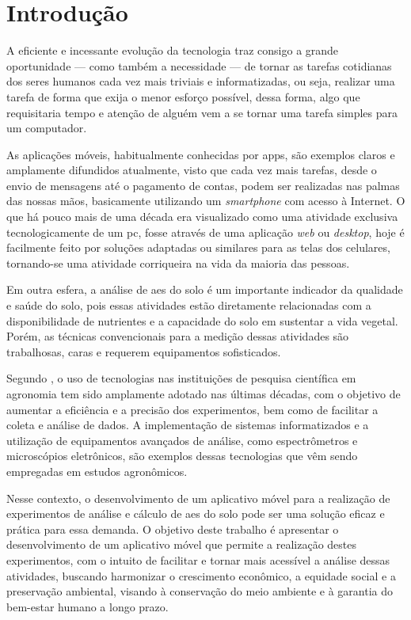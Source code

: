 \chapter{Introdução}
\label{chp:introduction}
A eficiente e incessante evolução da tecnologia traz consigo a grande oportunidade — como também a necessidade — de tornar as tarefas cotidianas dos seres humanos cada vez mais triviais e informatizadas, ou seja, realizar uma tarefa de forma que exija o menor esforço possível, dessa forma, algo que requisitaria tempo e atenção de alguém vem a se tornar uma tarefa simples para um computador.

As aplicações móveis, habitualmente conhecidas por \acp{app}, são exemplos claros e amplamente difundidos atualmente, visto que cada vez mais tarefas, desde o envio de mensagens até o pagamento de contas, podem ser realizadas nas palmas das nossas mãos, basicamente utilizando um \textit{smartphone} com acesso à Internet. O que há pouco mais de uma década era visualizado como uma atividade exclusiva tecnologicamente de um \ac{pc}, fosse através de uma aplicação \textit{web} ou \textit{desktop}, hoje é facilmente feito por soluções adaptadas ou similares para as telas dos celulares, tornando-se uma atividade corriqueira na vida da maioria das pessoas.

Em outra esfera, a análise de \acp{ae} do solo é um importante indicador da qualidade e saúde do solo, pois essas atividades estão diretamente relacionadas com a disponibilidade de nutrientes e a capacidade do solo em sustentar a vida vegetal. Porém, as técnicas convencionais para a medição dessas atividades são trabalhosas, caras e requerem equipamentos sofisticados.

Segundo \cite{nascimento2017impacto}, o uso de tecnologias nas instituições de pesquisa científica em agronomia tem sido amplamente adotado nas últimas décadas, com o objetivo de aumentar a eficiência e a precisão dos experimentos, bem como de facilitar a coleta e análise de dados. A implementação de sistemas informatizados e a utilização de equipamentos avançados de análise, como espectrômetros e microscópios eletrônicos, são exemplos dessas tecnologias que vêm sendo empregadas em estudos agronômicos.

Nesse contexto, o desenvolvimento de um aplicativo móvel para a realização de experimentos de análise e cálculo de \acp{ae} do solo pode ser uma solução eficaz e prática para essa demanda. O objetivo deste trabalho é apresentar o desenvolvimento de um aplicativo móvel que permite a realização destes experimentos, com o intuito de facilitar e tornar mais acessível a análise dessas atividades, buscando harmonizar o crescimento econômico, a equidade social e a preservação ambiental, visando à conservação do meio ambiente e à garantia do bem-estar humano a longo prazo.

